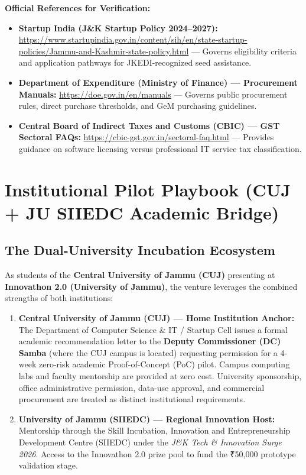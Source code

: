 \documentclass[11pt,a4paper]{article}
\newcommand{\JK}{J\&K}
\begin{document}
\vspace{0.1cm}
\noindent\textbf{Official References for Verification:}
\begin{itemize}[noitemsep,topsep=0pt]
    \item \textbf{Startup India (\JK{} Startup Policy 2024--2027):} \url{https://www.startupindia.gov.in/content/sih/en/state-startup-policies/Jammu-and-Kashmir-state-policy.html} --- Governs eligibility criteria and application pathways for JKEDI-recognized seed assistance.
    \item \textbf{Department of Expenditure (Ministry of Finance) --- Procurement Manuals:} \url{https://doe.gov.in/en/manuals} --- Governs public procurement rules, direct purchase thresholds, and GeM purchasing guidelines.
    \item \textbf{Central Board of Indirect Taxes and Customs (CBIC) --- GST Sectoral FAQs:} \url{https://cbic-gst.gov.in/sectoral-faq.html} --- Provides guidance on software licensing versus professional IT service tax classification.
\end{itemize}

\vspace{0.2cm}

\section{Institutional Pilot Playbook (CUJ + JU SIIEDC Academic Bridge)}

\subsection{The Dual-University Incubation Ecosystem}
As students of the \textbf{Central University of Jammu (CUJ)} presenting at \textbf{Innovathon 2.0 (University of Jammu)}, the venture leverages the combined strengths of both institutions:
\begin{enumerate}
    \item \textbf{Central University of Jammu (CUJ) --- Home Institution Anchor:}
    The Department of Computer Science \& IT / Startup Cell issues a formal academic recommendation letter to the \textbf{Deputy Commissioner (DC) Samba} (where the CUJ campus is located) requesting permission for a 4-week zero-risk academic Proof-of-Concept (PoC) pilot. Campus computing labs and faculty mentorship are provided at zero cost. University sponsorship, office administrative permission, data-use approval, and commercial procurement are treated as distinct institutional requirements.
    \item \textbf{University of Jammu (SIIEDC) --- Regional Innovation Host:}
    Mentorship through the Skill Incubation, Innovation and Entrepreneurship Development Centre (SIIEDC) under the \textit{J\&K Tech \& Innovation Surge 2026}. Access to the Innovathon 2.0 prize pool to fund the ₹50,000 prototype validation stage.
\end{enumerate}
\end{document}
